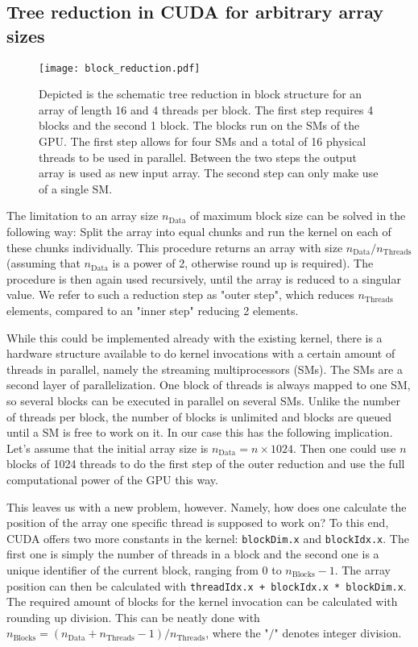 \subsection{Tree reduction in CUDA for arbitrary array sizes}
\begin{figure}
    \centering
    \texttt{[image: block\_reduction.pdf]}
    \caption{
        Depicted is the schematic tree reduction in block structure for an array of length 16 and 4 threads per block.
        The first step requires 4 blocks and the second 1 block.
        The blocks run on the SMs of the GPU.
        The first step allows for four SMs and a total of 16 physical threads to be used in parallel.
        Between the two steps the output array is used as new input array.
        The second step can only make use of a single SM.
    }
\end{figure}
The limitation to an array size \( n_{\mathrm{Data}}\) of maximum block size can be solved in the following way:
Split the array into equal chunks and run the kernel on each of these chunks individually.
This procedure returns an array with size \( n_{\mathrm{Data}}/ n_{\mathrm{Threads}} \) (assuming that \( n_{\mathrm{Data}} \) is a power of 2, otherwise round up is required).
The procedure is then again used recursively, until the array is reduced to a singular value.
We refer to such a reduction step as "outer step", which reduces \( n_{\mathrm{Threads}} \) elements, compared to an "inner step" reducing 2 elements.

While this could be implemented already with the existing kernel, there is a hardware structure available to do kernel invocations with a certain amount of threads in parallel, namely the streaming multiprocessors (SMs).
The SMs are a second layer of parallelization.
One block of threads is always mapped to one SM, so several blocks can be executed in parallel on several SMs.
Unlike the number of threads per block, the number of blocks is unlimited and blocks are queued until a SM is free to work on it.
In our case this has the following implication.
Let's assume that the initial array size is \( n_{\mathrm{Data}} = n \times 1024 \).
Then one could use \( n \) blocks of 1024 threads to do the first step of the outer reduction and use the full computational power of the GPU this way.

This leaves us with a new problem, however.
Namely, how does one calculate the position of the array one specific thread is supposed to work on?
To this end, CUDA offers two more constants in the kernel:
\texttt{blockDim.x} and \texttt{blockIdx.x}.
The first one is simply the number of threads in a block and the second one is a unique identifier of the current block, ranging from 0 to \( n_{\mathrm{Blocks}} - 1\).
The array position can then be calculated with \texttt{threadIdx.x + blockIdx.x * blockDim.x}.
The required amount of blocks for the kernel invocation can be calculated with rounding up division.
This can be neatly done with \( n_{\mathrm{Blocks}} = (n_{\mathrm{Data}} + n_{\mathrm{Threads}} - 1) / n_{\mathrm{Threads}} \), where the "\( / \)" denotes integer division.

